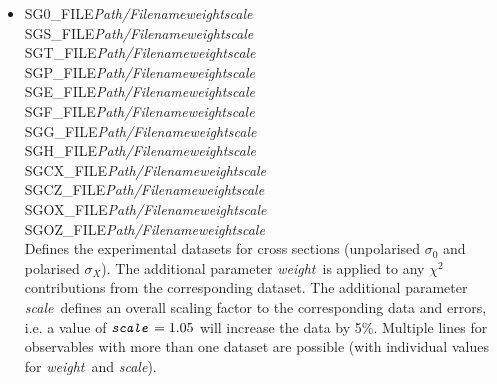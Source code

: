 \documentclass[a4paper,10pt]{article}
\def\bl{\phantom{0}}
\def\tt{\ttfamily}
\def\rm{\rmfamily}
\begin{document}
\begin{itemize}
\item
\tt SG0\_FILE\bl\bl \textit{Path/Filename}\bl \textit{weight}\bl \textit{scale}\rm\\
\tt SGS\_FILE\bl\bl \textit{Path/Filename}\bl \textit{weight}\bl \textit{scale}\rm\\
\tt SGT\_FILE\bl\bl \textit{Path/Filename}\bl \textit{weight}\bl \textit{scale}\rm\\
\tt SGP\_FILE\bl\bl \textit{Path/Filename}\bl \textit{weight}\bl \textit{scale}\rm\\
\tt SGE\_FILE\bl\bl \textit{Path/Filename}\bl \textit{weight}\bl \textit{scale}\rm\\
\tt SGF\_FILE\bl\bl \textit{Path/Filename}\bl \textit{weight}\bl \textit{scale}\rm\\
\tt SGG\_FILE\bl\bl \textit{Path/Filename}\bl \textit{weight}\bl \textit{scale}\rm\\
\tt SGH\_FILE\bl\bl \textit{Path/Filename}\bl \textit{weight}\bl \textit{scale}\rm\\
\tt SGCX\_FILE\bl   \textit{Path/Filename}\bl \textit{weight}\bl \textit{scale}\rm\\
\tt SGCZ\_FILE\bl   \textit{Path/Filename}\bl \textit{weight}\bl \textit{scale}\rm\\
\tt SGOX\_FILE\bl   \textit{Path/Filename}\bl \textit{weight}\bl \textit{scale}\rm\\
\tt SGOZ\_FILE\bl   \textit{Path/Filename}\bl \textit{weight}\bl \textit{scale}\rm\\
Defines the experimental datasets for cross sections (unpolarised $\sigma_0$ and polarised $\sigma_X$). The additional
parameter \tt\textit{weight}\rm\ is applied to any $\chi^2$ contributions from the corresponding dataset. The additional
parameter \tt\textit{scale}\rm\ defines an overall scaling factor to the corresponding data and errors, i.e.
a value of $\mbox{\tt\textit{scale}\rm} = 1.05$ will increase the data by 5\%.
Multiple lines for observables with more than one dataset are possible (with individual values for
\tt\textit{weight}\rm\ and \tt\textit{scale}\rm).


\end{itemize}
\end{document}
